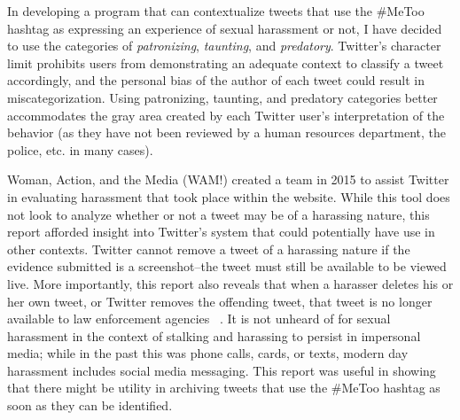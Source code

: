 In developing a program that can contextualize tweets that use the \#MeToo hashtag as expressing an experience of sexual harassment or not, I have decided to use the categories of \textit{patronizing}, \textit{taunting}, and \textit{predatory}. Twitter's character limit prohibits users from demonstrating an adequate context to classify a tweet accordingly, and the personal bias of the author of each tweet could result in miscategorization. Using patronizing, taunting, and predatory categories better accommodates the gray area created by each Twitter user's interpretation of the behavior (as they have not been reviewed by a human resources department, the police, etc. in many cases).

Woman, Action, and the Media (WAM!) created a team in 2015 to assist Twitter in evaluating harassment that took place within the website. While this tool does not look to analyze whether or not a tweet may be of a harassing nature, this report afforded insight into Twitter's system that could potentially have use in other contexts. Twitter cannot remove a tweet of a harassing nature if the evidence submitted is a screenshot--the tweet must still be available to be viewed live. More importantly, this report also reveals that when a harasser deletes his or her own tweet, or Twitter removes the offending tweet, that tweet is no longer available to law enforcement agencies ~\cite{matias2015reporting}. It is not unheard of for sexual harassment in the context of stalking and harassing to persist in impersonal media; while in the past this was phone calls, cards, or texts, modern day harassment includes social media messaging. This report was useful in showing that there might be utility in archiving tweets that use the \#MeToo hashtag as soon as they can be identified.
